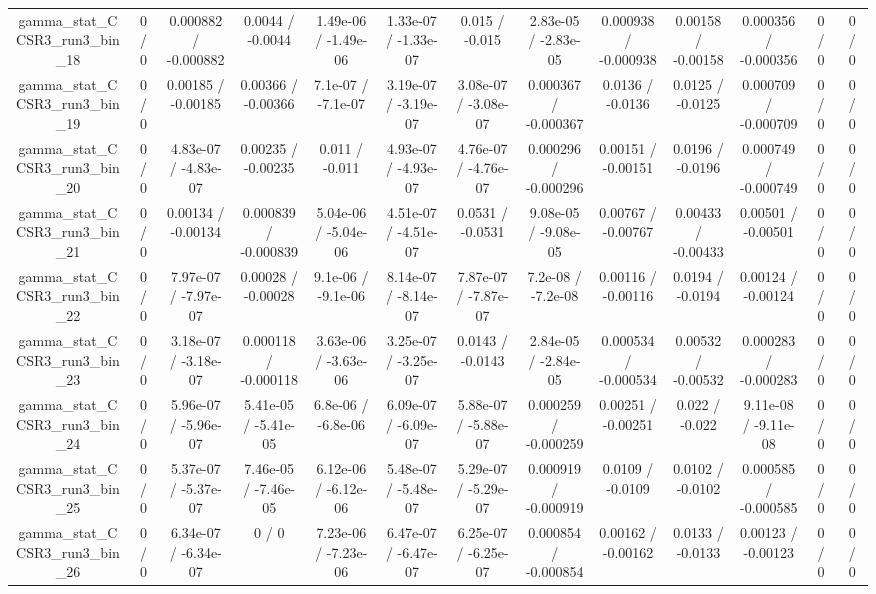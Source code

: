 \documentclass[10pt]{article}
\begin{document}
\begin{table}[htbp]
\begin{center}
\begin{tabular}{|c|c|c|c|c|c|c|c|c|c|c|c|c|}
  gamma_stat_CCSR3_run3_bin_18 & 0 / 0 & 0.000882 / -0.000882 & 0.0044 / -0.0044 & 1.49e-06 / -1.49e-06 & 1.33e-07 / -1.33e-07 & 0.015 / -0.015 & 2.83e-05 / -2.83e-05 & 0.000938 / -0.000938 & 0.00158 / -0.00158 & 0.000356 / -0.000356 & 0 / 0 & 0 / 0 \\ 
  gamma_stat_CCSR3_run3_bin_19 & 0 / 0 & 0.00185 / -0.00185 & 0.00366 / -0.00366 & 7.1e-07 / -7.1e-07 & 3.19e-07 / -3.19e-07 & 3.08e-07 / -3.08e-07 & 0.000367 / -0.000367 & 0.0136 / -0.0136 & 0.0125 / -0.0125 & 0.000709 / -0.000709 & 0 / 0 & 0 / 0 \\ 
  gamma_stat_CCSR3_run3_bin_20 & 0 / 0 & 4.83e-07 / -4.83e-07 & 0.00235 / -0.00235 & 0.011 / -0.011 & 4.93e-07 / -4.93e-07 & 4.76e-07 / -4.76e-07 & 0.000296 / -0.000296 & 0.00151 / -0.00151 & 0.0196 / -0.0196 & 0.000749 / -0.000749 & 0 / 0 & 0 / 0 \\ 
  gamma_stat_CCSR3_run3_bin_21 & 0 / 0 & 0.00134 / -0.00134 & 0.000839 / -0.000839 & 5.04e-06 / -5.04e-06 & 4.51e-07 / -4.51e-07 & 0.0531 / -0.0531 & 9.08e-05 / -9.08e-05 & 0.00767 / -0.00767 & 0.00433 / -0.00433 & 0.00501 / -0.00501 & 0 / 0 & 0 / 0 \\ 
  gamma_stat_CCSR3_run3_bin_22 & 0 / 0 & 7.97e-07 / -7.97e-07 & 0.00028 / -0.00028 & 9.1e-06 / -9.1e-06 & 8.14e-07 / -8.14e-07 & 7.87e-07 / -7.87e-07 & 7.2e-08 / -7.2e-08 & 0.00116 / -0.00116 & 0.0194 / -0.0194 & 0.00124 / -0.00124 & 0 / 0 & 0 / 0 \\ 
  gamma_stat_CCSR3_run3_bin_23 & 0 / 0 & 3.18e-07 / -3.18e-07 & 0.000118 / -0.000118 & 3.63e-06 / -3.63e-06 & 3.25e-07 / -3.25e-07 & 0.0143 / -0.0143 & 2.84e-05 / -2.84e-05 & 0.000534 / -0.000534 & 0.00532 / -0.00532 & 0.000283 / -0.000283 & 0 / 0 & 0 / 0 \\ 
  gamma_stat_CCSR3_run3_bin_24 & 0 / 0 & 5.96e-07 / -5.96e-07 & 5.41e-05 / -5.41e-05 & 6.8e-06 / -6.8e-06 & 6.09e-07 / -6.09e-07 & 5.88e-07 / -5.88e-07 & 0.000259 / -0.000259 & 0.00251 / -0.00251 & 0.022 / -0.022 & 9.11e-08 / -9.11e-08 & 0 / 0 & 0 / 0 \\ 
  gamma_stat_CCSR3_run3_bin_25 & 0 / 0 & 5.37e-07 / -5.37e-07 & 7.46e-05 / -7.46e-05 & 6.12e-06 / -6.12e-06 & 5.48e-07 / -5.48e-07 & 5.29e-07 / -5.29e-07 & 0.000919 / -0.000919 & 0.0109 / -0.0109 & 0.0102 / -0.0102 & 0.000585 / -0.000585 & 0 / 0 & 0 / 0 \\ 
  gamma_stat_CCSR3_run3_bin_26 & 0 / 0 & 6.34e-07 / -6.34e-07 & 0 / 0 & 7.23e-06 / -7.23e-06 & 6.47e-07 / -6.47e-07 & 6.25e-07 / -6.25e-07 & 0.000854 / -0.000854 & 0.00162 / -0.00162 & 0.0133 / -0.0133 & 0.00123 / -0.00123 & 0 / 0 & 0 / 0 \\ 

\end{tabular}
\end{center}
\end{table}
\end{document}
